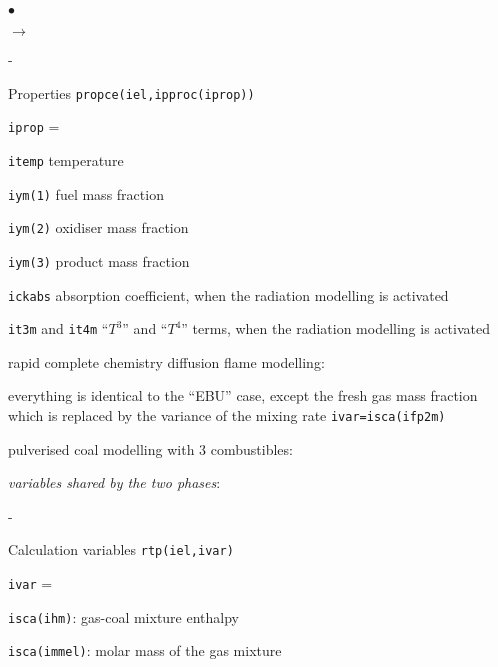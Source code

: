 {{\begin{list}{$\bullet$}{}
\begin{list}{$\rightarrow$}{}
\begin{list}{-}{}
        \item Properties \texttt{propce(iel,ipproc(iprop))}
              \begin{list}{\texttt{iprop} = }{}
               \item \texttt{itemp} temperature
               \item \texttt{iym(1)} fuel mass fraction
               \item \texttt{iym(2)} oxidiser mass fraction
               \item \texttt{iym(3)} product mass fraction
               \item \texttt{ickabs} absorption
                     coefficient, when the radiation modelling is
                     activated
               \item \texttt{it3m} and \texttt{it4m}
                     ``$T^3$'' and ``$T^4$'' terms, when the radiation
                     modelling is activated
              \end{list}
       \end{list}
       \item rapid complete chemistry diffusion flame modelling:
             \begin{list}{}{}
              \item  everything is identical to the ``EBU'' case, except
                     the fresh gas mass fraction which is replaced by the
                     variance of the mixing rate \texttt{ivar=isca(ifp2m)}
             \end{list}
       \item pulverised coal modelling with 3 combustibles:
             \begin{list}{}{}
              \item {\em variables shared by the two phases}:
                    \begin{list}{-}{}
                     \item Calculation variables \texttt{rtp(iel,ivar)}
                           \begin{list}{\texttt{ivar} = }{}
                            \item \texttt{isca(ihm)}: gas-coal mixture enthalpy
                            \item \texttt{isca(immel)}: molar mass of the
                                  gas mixture
                           \end{list}

\end{list}
\end{list}
\end{list}
\end{list}}}
